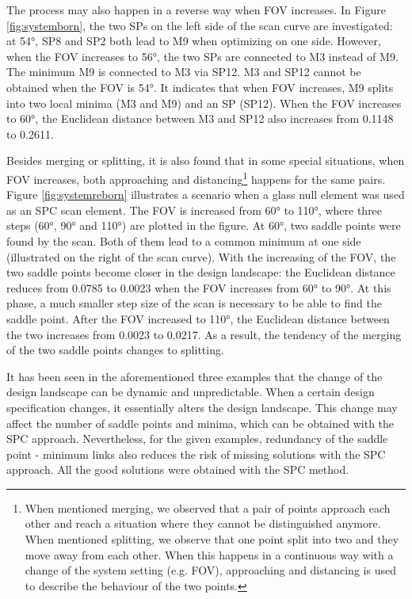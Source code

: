 The process may also happen in a reverse way when FOV increases. In Figure \ref{fig:systemborn}, the two SPs on the left side of the scan curve are investigated: at 54°, SP8 and SP2 both lead to M9 when optimizing on one side. However, when the FOV increases to 56°, the two SPs are connected to M3 instead of M9. The minimum M9 is connected to M3 via SP12. M3 and SP12 cannot be obtained when the FOV is 54°. It indicates that when FOV increases, M9 splits into two local minima (M3 and M9) and an SP (SP12). When the FOV increases to 60°, the Euclidean distance between M3 and SP12 also increases from 0.1148 to 0.2611. 

Besides merging or splitting, it is also found that in some special situations, when FOV increases, both approaching and distancing\footnote{When mentioned merging, we observed that a pair of points approach each other and reach a situation where they cannot be distinguished anymore. When mentioned splitting, we observe that one point split into two and they move away from each other. When this happens in a continuous way with a change of the system setting (e.g. FOV), approaching and distancing is used to describe the behaviour of the two points.} happens for the same pairs. Figure \ref{fig:systemreborn} illustrates a scenario when a glass null element was used as an SPC scan element. The FOV is increased from 60° to 110°, where three steps (60°, 90° and 110°) are plotted in the figure. At 60°, two saddle points were found by the scan. Both of them lead to a common minimum at one side (illustrated on the right of the scan curve). With the increasing of the FOV, the two saddle points become closer in the design landscape: the Euclidean distance reduces from 0.0785 to 0.0023 when the FOV increases from 60° to 90°. At this phase, a much smaller step size of the scan is necessary to be able to find the saddle point. After the FOV increased to 110°, the Euclidean distance between the two increases from 0.0023 to 0.0217. As a result, the tendency of the merging of the two saddle points changes to splitting. 

It has been seen in the aforementioned three examples that the change of the design landscape can be dynamic and unpredictable. When a certain design specification changes, it essentially alters the design landscape. This change may affect the number of saddle points and minima, which can be obtained with the SPC approach. Nevertheless, for the given examples, redundancy of the saddle point - minimum links also reduces the risk of missing solutions with the SPC approach. All the good solutions were obtained with the SPC method.

